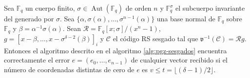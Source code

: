 \begin{theorem}
  Sea \(\mathbb F_q\) un cuerpo finito, \(\sigma \in \operatorname{Aut}(\mathbb F_q)\) de orden \(n\) y \(\mathbb F_q^{\sigma}\) el subcuerpo invariante del generado por \(\sigma\).
  Sea \(\{\alpha, \sigma(\alpha), \dots, \sigma^{n-1}(\alpha)\}\) una base normal de \(\mathbb F_q\) sobre \(\mathbb F_{q}\) y \(\beta = \alpha^{-1}\sigma(\alpha)\).
  Sean \(\mathcal R = \mathbb F_q[x; \sigma]/(x^n - 1)\), \(g = \left[x - \beta, \dots, x - \sigma^{\delta - 2}(\beta)\right]_{i}\) y \(\mathcal C\) el código RS sesgado tal que \(\mathfrak v^{-1}(\mathcal C) = \mathcal Rg\).
  Entonces el algoritmo descrito en el algoritmo \ref{alg:pgz-sesgados} encuentra correctamente el error \(e = (e_0, \dots, e_{n-1})\) de cualquier vector recibido si el número de coordenadas distintas de cero de \(e\) es \(v \leq t = \lfloor (\delta - 1)/2 \rfloor\).
\end{theorem}

